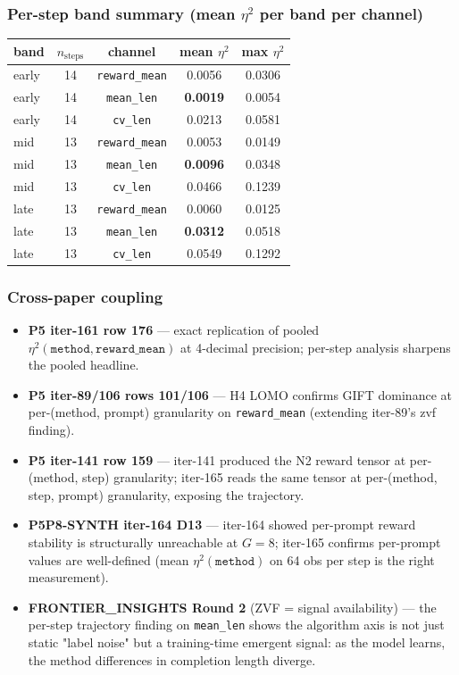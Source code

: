 \subsubsection{Per-step band summary (mean \texorpdfstring{$\eta^2$}{eta\textasciicircum 2} per band per channel)}
\begin{tabular}{lcccc}
\hline
band & $n_{\mathrm{steps}}$ & channel & mean $\eta^2$ & max $\eta^2$ \\
\hline
early & 14 & \texttt{reward\_mean} & 0.0056 & 0.0306 \\
early & 14 & \texttt{mean\_len}     & \textbf{0.0019} & 0.0054 \\
early & 14 & \texttt{cv\_len}       & 0.0213 & 0.0581 \\
mid   & 13 & \texttt{reward\_mean} & 0.0053 & 0.0149 \\
mid   & 13 & \texttt{mean\_len}     & \textbf{0.0096} & 0.0348 \\
mid   & 13 & \texttt{cv\_len}       & 0.0466 & 0.1239 \\
late  & 13 & \texttt{reward\_mean} & 0.0060 & 0.0125 \\
late  & 13 & \texttt{mean\_len}     & \textbf{0.0312} & 0.0518 \\
late  & 13 & \texttt{cv\_len}       & 0.0549 & 0.1292 \\
\hline
\end{tabular}

\subsubsection{Cross-paper coupling}
\begin{itemize}
\item \textbf{P5 iter-161 row 176} --- exact replication of pooled $\eta^2(\texttt{method}, \texttt{reward\_mean})$ at 4-decimal precision; per-step analysis sharpens the pooled headline.
\item \textbf{P5 iter-89/106 rows 101/106} --- H4 LOMO confirms GIFT dominance at per-(method, prompt) granularity on \texttt{reward\_mean} (extending iter-89's zvf finding).
\item \textbf{P5 iter-141 row 159} --- iter-141 produced the N2 reward tensor at per-(method, step) granularity; iter-165 reads the same tensor at per-(method, step, prompt) granularity, exposing the trajectory.
\item \textbf{P5P8-SYNTH iter-164 D13} --- iter-164 showed per-prompt reward stability is structurally unreachable at $G{=}8$; iter-165 confirms per-prompt values are well-defined (mean $\eta^2(\texttt{method})$ on 64 obs per step is the right measurement).
\item \textbf{FRONTIER\_INSIGHTS Round 2} (ZVF = signal availability) --- the per-step trajectory finding on \texttt{mean\_len} shows the algorithm axis is not just static "label noise" but a training-time emergent signal: as the model learns, the method differences in completion length diverge.
\end{itemize}

